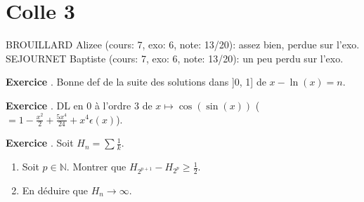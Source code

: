 \documentclass[10pt,a4paper]{article}
\newcounter{question}
\newcounter{exo}
\newenvironment{exo}{\vspace{0.5cm}\setcounter{question}{0}\addtocounter{exo}{1} \noindent \textbf{Exercice \theexo}. \normalsize }{\par}
\begin{document}
	\section*{Colle 3}
	\setcounter{exo}{0}
	BROUILLARD Alizee (cours: 7, exo: 6, note: 13/20): assez bien, perdue sur l'exo.\\
	SEJOURNET Baptiste (cours: 7, exo: 6, note: 13/20): un peu perdu sur l'exo.\\
	
	\begin{exo}
		Bonne def de la suite des solutions dans ]0, 1] de $x - \ln(x) = n$.
	\end{exo}
	
	\begin{exo}
		DL en 0 à l'ordre 3 de $x \longmapsto \cos(\sin(x))$ ($= 1 - \frac{x^2}{2} + \frac{5x^4}{24} + x^4 \epsilon(x)$).
	\end{exo}	
	
	\begin{exo}
		Soit $H_n = \sum \frac{1}{k}$.
		\begin{enumerate}
			\item Soit $p \in \mathbb{N}$. Montrer que $H_{2^{p+1}} - H_{2^p} \geq \frac{1}{2}$.
			\item En déduire que $H_n \longrightarrow \infty$.
		\end{enumerate}
	\end{exo}
	
\end{document}
